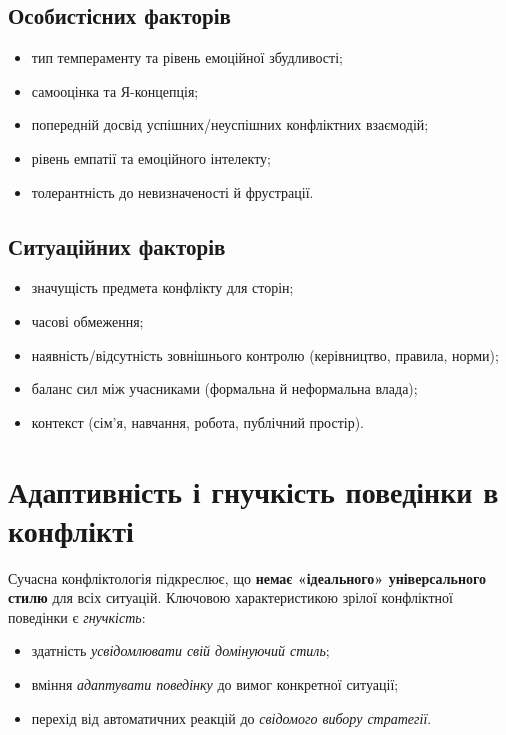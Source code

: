 \documentclass[12pt,a4paper]{article}
\begin{document}
    \subsection*{Особистісних факторів}
    \begin{itemize}
        \item тип темпераменту та рівень емоційної збудливості;
        \item самооцінка та Я-концепція;
        \item попередній досвід успішних/неуспішних конфліктних взаємодій;
        \item рівень емпатії та емоційного інтелекту;
        \item толерантність до невизначеності й фрустрації.
    \end{itemize}

    \subsection*{Ситуаційних факторів}
    \begin{itemize}
        \item значущість предмета конфлікту для сторін;
        \item часові обмеження;
        \item наявність/відсутність зовнішнього контролю (керівництво, правила, норми);
        \item баланс сил між учасниками (формальна й неформальна влада);
        \item контекст (сім’я, навчання, робота, публічний простір).
    \end{itemize}

    \section*{Адаптивність і гнучкість поведінки в конфлікті}
    Сучасна конфліктологія підкреслює, що \textbf{немає «ідеального» універсального стилю} для всіх ситуацій. 
    Ключовою характеристикою зрілої конфліктної поведінки є \textit{гнучкість}:
    \begin{itemize}
        \item здатність \textit{усвідомлювати свій домінуючий стиль};
        \item вміння \textit{адаптувати поведінку} до вимог конкретної ситуації;
        \item перехід від автоматичних реакцій до \textit{свідомого вибору стратегії}.
    \end{itemize}
\end{document}
